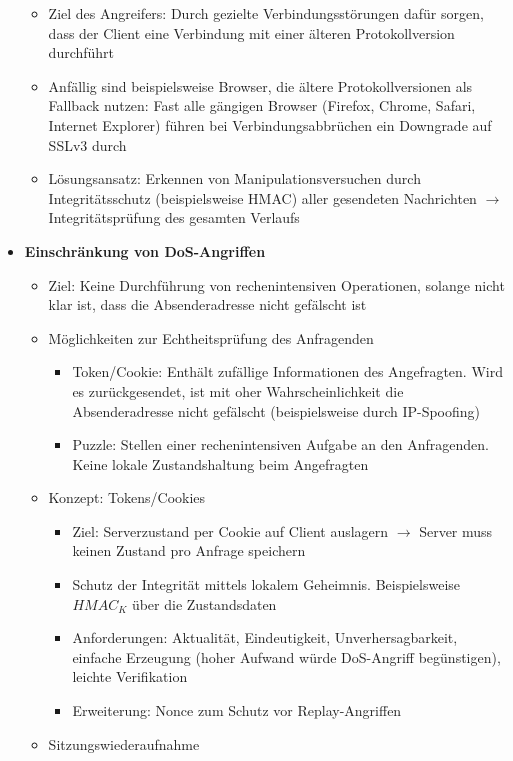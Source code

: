 \begin{itemize}
	\begin{itemize}
		\item Ziel des Angreifers: Durch gezielte Verbindungsstörungen dafür sorgen, dass der Client eine Verbindung mit einer älteren Protokollversion durchführt
		\item Anfällig sind beispielsweise Browser, die ältere Protokollversionen als Fallback nutzen: Fast alle gängigen Browser (Firefox, Chrome, Safari, Internet Explorer) führen bei Verbindungsabbrüchen ein Downgrade auf SSLv3 durch
		\item Lösungsansatz: Erkennen von Manipulationsversuchen durch Integritätsschutz (beispielsweise HMAC) aller gesendeten Nachrichten \(\rightarrow\) Integritätsprüfung des gesamten Verlaufs
	\end{itemize}
	\item \textbf{Einschränkung von DoS-Angriffen}
	\begin{itemize}
		\item Ziel: Keine Durchführung von rechenintensiven Operationen, solange nicht klar ist, dass die Absenderadresse nicht gefälscht ist
		\item Möglichkeiten zur Echtheitsprüfung des Anfragenden
		\begin{itemize}
			\item Token/Cookie: Enthält zufällige Informationen des Angefragten. Wird es zurückgesendet, ist mit oher Wahrscheinlichkeit die Absenderadresse nicht gefälscht (beispielsweise durch IP-Spoofing)
			\item Puzzle: Stellen einer rechenintensiven Aufgabe an den Anfragenden. Keine lokale Zustandshaltung beim Angefragten
		\end{itemize}
		\item Konzept: Tokens/Cookies
		\begin{itemize}
			\item Ziel: Serverzustand per Cookie auf Client auslagern \(\rightarrow\) Server muss keinen Zustand pro Anfrage speichern
			\item Schutz der Integrität mittels lokalem Geheimnis. Beispielsweise \(HMAC_K\) über die Zustandsdaten
			\item Anforderungen: Aktualität, Eindeutigkeit, Unverhersagbarkeit, einfache Erzeugung (hoher Aufwand würde DoS-Angriff begünstigen), leichte Verifikation
			\item Erweiterung: Nonce zum Schutz vor Replay-Angriffen
		\end{itemize}
		\item Sitzungswiederaufnahme

\end{itemize}
\end{itemize}
